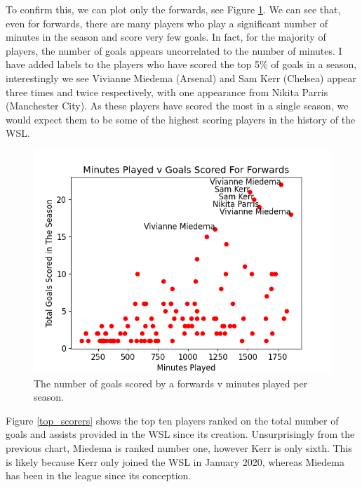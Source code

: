 \documentclass[12pt, a4paper, twocolumn]{article}
\begin{document}
To confirm this, we can plot only the forwards, see Figure \ref{goal_min_fw}. We can see that, even for forwards, there are many players who play a significant number of minutes in the season and score very few goals. In fact, for the majority of players, the number of goals appears uncorrelated to the number of minutes. I have added labels to the players who have scored the top 5\% of goals in a season, interestingly we see Vivianne Miedema (Arsenal) and Sam Kerr (Chelsea) appear three times and twice respectively, with one appearance from Nikita Parris (Manchester City). As these players have scored the most in a single season, we would expect them to be some of the highest scoring players in the history of the WSL.

\begin{figure}
  \includegraphics[width=\linewidth]{../vis/playerStats/goal_minutes_forwards.png}
  \caption{The number of goals scored by a forwards v minutes played per season.}
  \label{goal_min_fw}
\end{figure}

Figure \ref{top_scorers} shows the top ten players ranked on the total number of goals and assists provided in the WSL since its creation. Unsurprisingly from the previous chart, Miedema is ranked number one, however Kerr is only sixth. This is likely because Kerr only joined the WSL in January 2020, whereas Miedema has been in the league since its conception. 
\end{document}
